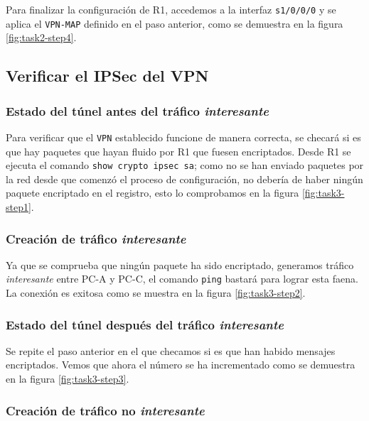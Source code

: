 \documentclass{article}
\begin{document}
                Para finalizar la configuración de R1, accedemos a la interfaz \texttt{s1/0/0/0} y se aplica el \texttt{VPN-MAP} definido en el paso anterior, como se demuestra en la figura \ref{fig:task2-step4}.

        \subsection{Verificar el IPSec del VPN} \label{sec:vpn-test}

            \subsubsection{Estado del túnel antes del tráfico \emph{interesante}}

                Para verificar que el \texttt{VPN} establecido funcione de manera correcta, se checará si es que hay paquetes que hayan fluido por R1 que fuesen encriptados. Desde R1 se ejecuta el comando \texttt{show crypto ipsec sa}; como no se han enviado paquetes por la red desde que comenzó el proceso de configuración, no debería de haber ningún paquete encriptado en el registro, esto lo comprobamos en la figura \ref{fig:task3-step1}.

            \subsubsection{Creación de tráfico \emph{interesante}}

                Ya que se comprueba que ningún paquete ha sido encriptado, generamos tráfico \emph{interesante} entre PC-A y PC-C, el comando \texttt{ping} bastará para lograr esta faena. La conexión es exitosa como se muestra en la figura \ref{fig:task3-step2}.

            \subsubsection{Estado del túnel después del tráfico \emph{interesante}}

                Se repite el paso anterior en el que checamos si es que han habido mensajes encriptados. Vemos que ahora el número se ha incrementado como se demuestra en la figura \ref{fig:task3-step3}.

            \subsubsection{Creación de tráfico no \emph{interesante}}
\end{document}
